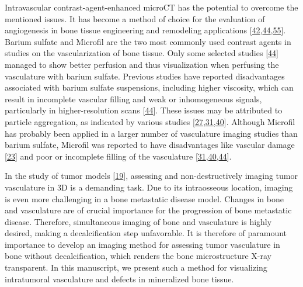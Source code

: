 Intravascular contrast-agent-enhanced microCT has the potential to overcome the mentioned issues.
It has become a method of choice for the evaluation of angiogenesis in bone tissue engineering and remodeling applications {[}\protect\hyperlink{ref-Vu36g0cK}{42},\protect\hyperlink{ref-AHsHFIUt}{44},\protect\hyperlink{ref-13YRlKdu2}{55}{]}.
Barium sulfate and Microfil are the two most commonly used contrast agents in studies on the vascularization of bone tissue.
Only some selected studies {[}\protect\hyperlink{ref-AHsHFIUt}{44}{]} managed to show better perfusion and thus visualization when perfusing the vasculature with barium sulfate.
Previous studies have reported disadvantages associated with barium sulfate suspensions, including higher viscosity, which can result in incomplete vascular filling and weak or inhomogeneous signals, particularly in higher-resolution scans {[}\protect\hyperlink{ref-AHsHFIUt}{44}{]}.
These issues may be attributed to particle aggregation, as indicated by various studies {[}\protect\hyperlink{ref-DWiXWNoA}{27},\protect\hyperlink{ref-Ror9Uhfa}{31},\protect\hyperlink{ref-KJUjdwi7}{40}{]}.
Although Microfil has probably been applied in a larger number of vasculature imaging studies than barium sulfate, Microfil was reported to have disadvantages like vascular damage {[}\protect\hyperlink{ref-1A0HsmRho}{23}{]} and poor or incomplete filling of the vasculature {[}\protect\hyperlink{ref-Ror9Uhfa}{31},\protect\hyperlink{ref-KJUjdwi7}{40},\protect\hyperlink{ref-AHsHFIUt}{44}{]}.

In the study of tumor models {[}\protect\hyperlink{ref-cNoYNu8B}{19}{]}, assessing and non-destructively imaging tumor vasculature in 3D is a demanding task.
Due to its intraosseous location, imaging is even more challenging in a bone metastatic disease model.
Changes in bone and vasculature are of crucial importance for the progression of bone metastatic disease.
Therefore, simultaneous imaging of bone and vasculature is highly desired, making a decalcification step unfavorable.
It is therefore of paramount importance to develop an imaging method for assessing tumor vasculature in bone without decalcification, which renders the bone microstructure X-ray transparent.
In this manuscript, we present such a method for visualizing intratumoral vasculature and defects in mineralized bone tissue.

